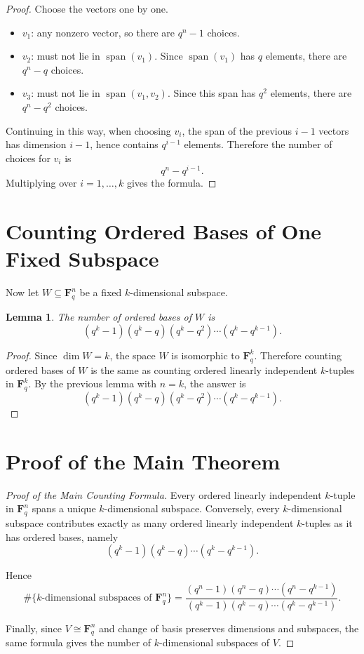 \documentclass[11pt]{article}
\newtheorem{lemma}[theorem]{Lemma}
\theoremstyle{definition}
\theoremstyle{remark}
\newcommand{\F}{\mathbf{F}}
\newcommand{\Span}{\operatorname{span}}
\begin{document}
	\begin{proof}
		Choose the vectors one by one.
		
		\begin{itemize}
			\item \(v_1\): any nonzero vector, so there are \(q^n-1\) choices.
			\item \(v_2\): must not lie in \(\Span(v_1)\). Since \(\Span(v_1)\) has \(q\) elements, there are \(q^n-q\) choices.
			\item \(v_3\): must not lie in \(\Span(v_1,v_2)\). Since this span has \(q^2\) elements, there are \(q^n-q^2\) choices.
		\end{itemize}
		
		Continuing in this way, when choosing \(v_i\), the span of the previous \(i-1\) vectors has dimension \(i-1\), hence contains \(q^{i-1}\) elements. Therefore the number of choices for \(v_i\) is
		\[
		q^n-q^{i-1}.
		\]
		Multiplying over \(i=1,\dots,k\) gives the formula.
	\end{proof}
	
	\section{Counting Ordered Bases of One Fixed Subspace}
	
	Now let \(W\subseteq \F_q^n\) be a fixed \(k\)-dimensional subspace.
	
	\begin{lemma}
		The number of ordered bases of \(W\) is
		\[
		(q^k-1)(q^k-q)(q^k-q^2)\cdots(q^k-q^{k-1}).
		\]
	\end{lemma}
	
	\begin{proof}
		Since \(\dim W=k\), the space \(W\) is isomorphic to \(\F_q^k\). Therefore counting ordered bases of \(W\) is the same as counting ordered linearly independent \(k\)-tuples in \(\F_q^k\). By the previous lemma with \(n=k\), the answer is
		\[
		(q^k-1)(q^k-q)(q^k-q^2)\cdots(q^k-q^{k-1}).
		\]
	\end{proof}
	
	\section{Proof of the Main Theorem}
	
	\begin{proof}[Proof of the Main Counting Formula]
		Every ordered linearly independent \(k\)-tuple in \(\F_q^n\) spans a unique \(k\)-dimensional subspace. Conversely, every \(k\)-dimensional subspace contributes exactly as many ordered linearly independent \(k\)-tuples as it has ordered bases, namely
		\[
		(q^k-1)(q^k-q)\cdots(q^k-q^{k-1}).
		\]
		
		Hence
		\[
		\#\{\text{\(k\)-dimensional subspaces of }\F_q^n\}
		=
		\frac{(q^n-1)(q^n-q)\cdots(q^n-q^{k-1})}
		{(q^k-1)(q^k-q)\cdots(q^k-q^{k-1})}.
		\]
		
		Finally, since \(V\cong \F_q^n\) and change of basis preserves dimensions and subspaces, the same formula gives the number of \(k\)-dimensional subspaces of \(V\).
	\end{proof}
	
\end{document}
